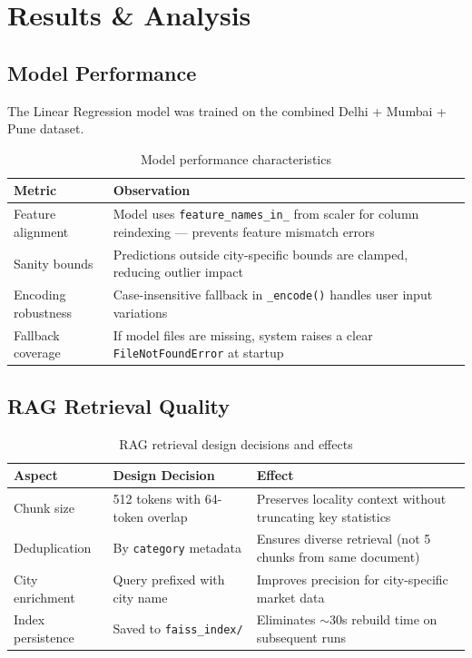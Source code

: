 \documentclass[12pt,a4paper]{article}
\newcommand{\code}[1]{\texttt{\small #1}}
\begin{document}
\section{Results \& Analysis}

\subsection{Model Performance}

The Linear Regression model was trained on the combined Delhi + Mumbai + Pune dataset.

\begin{table}[H]
\centering
\caption{Model performance characteristics}
\begin{tabularx}{\textwidth}{lX}
\toprule
\textbf{Metric} & \textbf{Observation} \\
\midrule
Feature alignment   & Model uses \code{feature\_names\_in\_} from scaler for column reindexing --- prevents feature mismatch errors \\
Sanity bounds       & Predictions outside city-specific bounds are clamped, reducing outlier impact \\
Encoding robustness & Case-insensitive fallback in \code{\_encode()} handles user input variations \\
Fallback coverage   & If model files are missing, system raises a clear \code{FileNotFoundError} at startup \\
\bottomrule
\end{tabularx}
\end{table}

\subsection{RAG Retrieval Quality}

\begin{table}[H]
\centering
\caption{RAG retrieval design decisions and effects}
\begin{tabularx}{\textwidth}{llX}
\toprule
\textbf{Aspect} & \textbf{Design Decision} & \textbf{Effect} \\
\midrule
Chunk size      & 512 tokens with 64-token overlap & Preserves locality context without truncating key statistics \\
Deduplication   & By \code{category} metadata      & Ensures diverse retrieval (not 5 chunks from same document) \\
City enrichment & Query prefixed with city name    & Improves precision for city-specific market data \\
Index persistence & Saved to \code{faiss\_index/}  & Eliminates $\sim$30s rebuild time on subsequent runs \\
\bottomrule
\end{tabularx}
\end{table}
\end{document}
